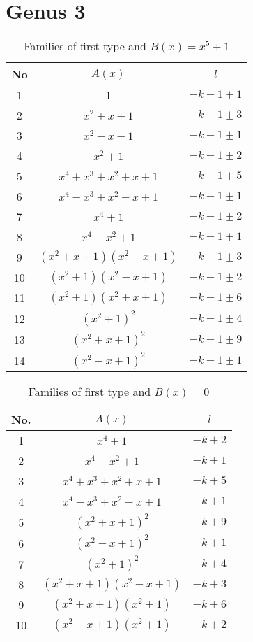 \documentclass{amsart}
\begin{document}
\section{Genus 3}
\begin{table}[ht]
\caption{Families of first type and $B(x)=x^5+1$}
\centering
\begin{tabular}{|c |c |c |}
\hline
No & $A(x)$  & $l$ \\
\hline
1 & 1 & $-k-1\pm 1$ \\
2 & $x^2+x+1$  &  $-k-1\pm 3$      \\
3 & $x^2-x+1$  &  $-k-1\pm 1$      \\
4 & $x^2+1$   & $-k-1\pm 2$       \\
5 & $x^4+x^3+x^2+x+1$  & $-k-1 \pm 5$       \\
6 & $x^4-x^3+x^2-x+1$  & $-k-1 \pm 1$       \\
7 & $x^4+1$  &  $-k-1 \pm 2$      \\
8 & $x^4-x^2+1$ & $-k-1 \pm 1$       \\
9 & $(x^2+x+1)(x^2-x+1)$ & $-k-1\pm 3$       \\
10 & $(x^2+1)(x^2-x+1)$  &    $-k-1\pm 2$    \\
11 & $(x^2+1)(x^2+x+1)$  &     $-k-1 \pm 6$   \\
12 & $(x^2+1)^2$  &  $-k-1 \pm 4$      \\
13 & $(x^2+x+1)^2$  &    $-k-1 \pm 9$    \\
14 & $(x^2-x+1)^2$  &  $-k-1 \pm 1$      \\
\hline
\end{tabular}
\end{table}


\begin{table}[ht]
\caption{Families of first type and $B(x)=0$}
\centering
\begin{tabular}{|c |c |c |}
\hline
No. & $A(x)$ & $l$ \\
\hline
1 & $x^4+1$  & $-k+2$ \\
2 & $x^4-x^2+1$  & $-k+1$ \\
3 & $x^4+x^3+x^2+x+1$  & $-k+5$ \\
4 & $x^4-x^3+x^2-x+1$  & $-k+1$ \\
5 & $(x^2+x+1)^2$ &  $-k+9$ \\
6 & $(x^2-x+1)^2$  & $-k+1$ \\
7 & $(x^2+1)^2$  & $-k+4$ \\
8 & $(x^2+x+1)(x^2-x+1)$  & $-k+3$ \\
9 & $(x^2+x+1)(x^2+1)$  & $-k+6$ \\
10 & $(x^2-x+1)(x^2+1)$  & $-k+2$ \\
\hline
\end{tabular}
\end{table}
\end{document}
